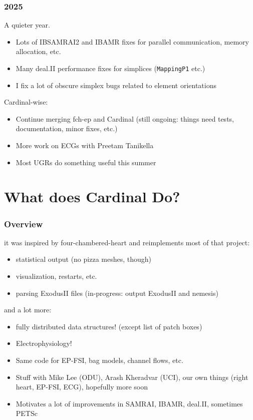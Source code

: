 \documentclass[8pt]{beamer}
\begin{document}
\begin{frame}
  \frametitle{2025}
  A quieter year.
  \begin{itemize}
    \item[$\blacksquare$] Lots of IBSAMRAI2 and IBAMR fixes for parallel communication,
      memory allocation, etc.
    \item[$\blacksquare$] Many deal.II performance fixes for simplices (\texttt{MappingP1} etc.)
    \item[$\blacksquare$] I fix a lot of obscure simplex bugs related to element orientations
  \end{itemize}
  \vfill

  Cardinal-wise:
  \begin{itemize}
    \item[$\blacksquare$] Continue merging fch-ep and Cardinal (still ongoing: things need tests,
      documentation, minor fixes, etc.)
    \item[$\blacksquare$] More work on ECGs with Preetam Tanikella
    \item[$\blacksquare$] Most UGRs do something useful this summer
  \end{itemize}
\end{frame}

\section{What does Cardinal Do?}
\begin{frame}
  \frametitle{Overview}
  it was inspired by four-chambered-heart and reimplements most of that project:
  \begin{itemize}
    \item[$\blacksquare$] statistical output (no pizza meshes, though)
    \item[$\blacksquare$] visualization, restarts, etc.
    \item[$\blacksquare$] parsing ExodusII files (in-progress: output ExodusII and nemesis)
  \end{itemize}

  and a lot more:
  \begin{itemize}
    \item[$\blacksquare$] fully distributed data structures! (except list of patch boxes)
    \item[$\blacksquare$] Electrophysiology!
    \item[$\blacksquare$] Same code for EP-FSI, bag models, channel flows, etc.
    \item[$\blacksquare$] Stuff with Mike Lee (ODU), Arash Kheradvar (UCI), our own things
      (right heart, EP-FSI, ECG), hopefully more soon
    \item[$\blacksquare$] Motivates a lot of improvements in SAMRAI, IBAMR, deal.II, sometimes PETSc
  \end{itemize}
\end{frame}
\end{document}
